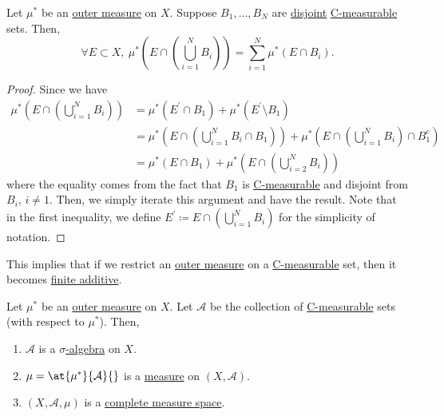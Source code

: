\begin{lemma}\label{lma:disjoint-C-measurable-finite-additive}
	Let \(\mu^{*} \) be an \hyperref[def:outer-measure]{outer measure} on \(X\). Suppose \(B_1, \ldots , B_N \) are \underline{disjoint} \hyperref[def:C-measurable]{C-measurable} sets.
	Then,
	\[
		\forall E\subset X,\ \mu^{*} \left(E\cap \left(\bigcup\limits_{i=1}^{N} B_{i}\right)\right) = \sum\limits_{i=1}^{N} \mu^{*} \left(E\cap B_i\right).
	\]
\end{lemma}
\begin{proof}
	Since we have
	\[
		\begin{split}
			\mu^{*} \left(E\cap \left(\bigcup\limits_{i=1}^{N} B_{i}\right)\right)
			&= \mu^{*} \left( E^\prime  \cap B_1\right) + \mu^{*} \left(E ^\prime \setminus B_1\right)\\
			&= \mu^{*} \left(E\cap \left(\bigcup\limits_{i=1}^{N} B_{i}\cap B_1\right)\right) + \mu^{*} \left(E\cap \left(\bigcup\limits_{i=1}^{N} B_{i}\right)\cap B^{c}_1\right)\\
			&= \mu^{*} (E\cap B_1) + \mu^{*} \left(E\cap \left(\bigcup\limits_{i=2}^{N} B_{i}\right)\right)
		\end{split}
	\]
	where the equality comes from the fact that \(B_1 \) is \hyperref[def:C-measurable]{C-measurable} and disjoint from \(B_{i}\), \(i\neq 1\). Then, we simply iterate this argument
	and have the result. Note that in the first inequality, we define \(E ^\prime\coloneqq E\cap \left(\bigcup\limits_{i=1}^{N} B_{i}\right)\) for the simplicity of notation.
\end{proof}
\begin{remark}
	This implies that if we restrict an \hyperref[def:outer-measure]{outer measure} on a \hyperref[def:C-measurable]{C-measurable} set, then it becomes \underline{finite additive}.
\end{remark}

\begin{theorem}\label{thm:Caratheodory-extension-Thm}
	Let \(\mu^{*} \) be an \hyperref[def:outer-measure]{outer measure} on \(X\). Let \(\mathcal{A} \) be the collection of \hyperref[def:C-measurable]{C-measurable} sets (with respect to \(\mu^{*} \)).
	Then,
	\begin{enumerate}
		\item \(\mathcal{A}\) is a \hyperref[def:sigma-algebra]{\(\sigma\)-algebra} on \(X\).
		\item \(\mu = \at{\mu^{*} }{\mathcal{A} }{}\) is a \hyperref[def:measure]{measure} on \((X, \mathcal{A})\).
		\item \((X, \mathcal{A} , \mu)\) is a \hyperref[def:complete-measure-space]{complete measure space}.
	\end{enumerate}
\end{theorem}

